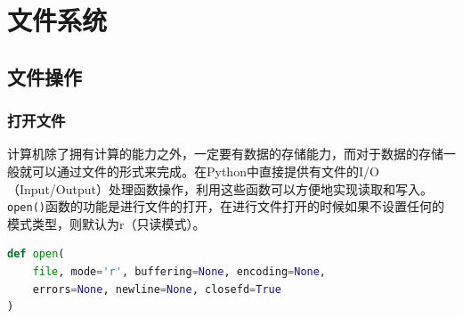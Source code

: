 \chapter{文件系统}

\section{文件操作}

\subsection{打开文件}

计算机除了拥有计算的能力之外，一定要有数据的存储能力，而对于数据的存储一般就可以通过文件的形式来完成。在Python中直接提供有文件的I/O（Input/Output）处理函数操作，利用这些函数可以方便地实现读取和写入。 \\

\lstinline|open()|函数的功能是进行文件的打开，在进行文件打开的时候如果不设置任何的模式类型，则默认为r（只读模式）。

\begin{lstlisting}[language=Python]
def open(
    file, mode='r', buffering=None, encoding=None,
    errors=None, newline=None, closefd=True
)
\end{lstlisting}

\begin{table}[H]
	\centering
	\caption{文件打开模式}
\end{table}

